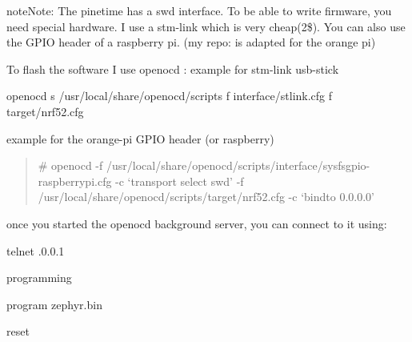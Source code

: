 \documentclass[letterpaper,10pt,english]{sphinxmanual}
\begin{document}
\begin{sphinxadmonition}{note}{Note:}
The pinetime has a swd interface.
To be able to write firmware,  you need special hardware.
I use a stm-link which is very cheap(2\$).
You can also use the GPIO header of a raspberry pi.
(my repo:  is adapted for the orange pi)
\end{sphinxadmonition}

To flash the software I use openocd :
example for stm-link usb-stick

\begin{sphinxVerbatim}[commandchars=\\\{\}]
 openocd \PYGZhy{}s /usr/local/share/openocd/scripts \PYGZhy{}f interface/stlink.cfg \PYGZhy{}f target/nrf52.cfg
\end{sphinxVerbatim}

example for the orange-pi GPIO header (or raspberry)
\begin{quote}

\# openocd -f /usr/local/share/openocd/scripts/interface/sysfsgpio-raspberrypi.cfg
-c ‘transport select swd’ -f /usr/local/share/openocd/scripts/target/nrf52.cfg
-c ‘bindto 0.0.0.0’
\end{quote}

once you started the openocd background server, you can connect to it using:

\begin{sphinxVerbatim}[commandchars=\\\{\}]
telnet .0.0.1 
\end{sphinxVerbatim}

programming

\begin{sphinxVerbatim}[commandchars=\\\{\}]
\PYG{g+go}{Escape character is \PYGZsq{}\PYGZca{}]\PYGZsq{}.}
 program zephyr.bin


reset
\end{sphinxVerbatim}
\end{document}
